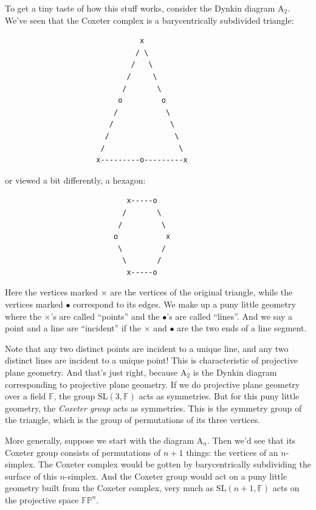 \documentclass{article}
\begin{document}
To get a tiny taste of how this stuff works, consider the Dynkin diagram
\(\mathrm{A}_2\). We've seen that the Coxeter complex is a
barycentrically subdivided triangle:

\begin{verbatim}
                               x
                              / \
                             /   \
                            /     \
                           /       \
                          o         o
                         /           \
                        /             \
                       /               \
                      /                 \
                     x---------o---------x
\end{verbatim}

or viewed a bit differently, a hexagon:

\begin{verbatim}
                            x-----o
                           /       \
                          /         \
                         o           x
                          \         /
                           \       /
                            x-----o
\end{verbatim}

Here the vertices marked \(\times\) are the vertices of the original
triangle, while the vertices marked \(\bullet\) correspond to its edges.
We make up a puny little geometry where the \(\times\)'s are called
``points'' and the \(\bullet\)'s are called ``lines''. And we say a
point and a line are ``incident'' if the \(\times\) and \(\bullet\) are
the two ends of a line segment.

Note that any two distinct points are incident to a unique line, and any
two distinct lines are incident to a unique point! This is
characteristic of projective plane geometry. And that's just right,
because \(\mathrm{A}_2\) is the Dynkin diagram corresponding to
projective plane geometry. If we do projective plane geometry over a
field \(\mathbb{F}\), the group \(\mathrm{SL}(3,\mathbb{F})\) acts as
symmetries. But for this puny little geometry, the \emph{Coxeter group}
acts as symmetries. This is the symmetry group of the triangle, which is
the group of permutations of its three vertices.

More generally, suppose we start with the diagram \(\mathrm{A}_n\). Then
we'd see that its Coxeter group consists of permutations of \(n+1\)
things: the vertices of an \(n\)-simplex. The Coxeter complex would be
gotten by barycentrically subdividing the surface of this \(n\)-simplex.
And the Coxeter group would act on a puny little geometry built from the
Coxeter complex, very much as \(\mathrm{SL}(n+1,\mathbb{F})\) acts on
the projective space \(\mathbb{FP}^n\).
\end{document}
